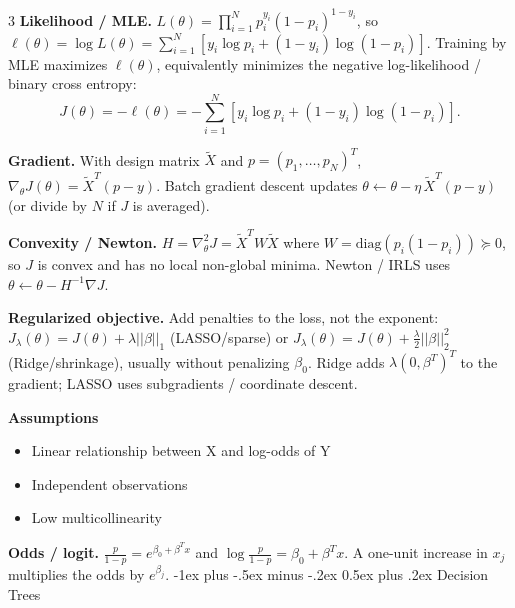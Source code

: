 \documentclass[10pt,landscape]{article}
\makeatletter
\renewcommand{\section}{\@startsection{section}{1}{0mm}%
                                {-1ex plus -.5ex minus -.2ex}%
                                {0.5ex plus .2ex}%
                                {\normalfont\large\bfseries}}
\makeatother
\begin{document}
\begin{multicols}{3}
    \textbf{Likelihood / MLE.}
    $\displaystyle L(\theta)=\prod_{i=1}^N p_i^{y_i}(1-p_i)^{1-y_i}$,
    so
    $\displaystyle \ell(\theta)=\log L(\theta)=\sum_{i=1}^N\left[y_i\log p_i+(1-y_i)\log(1-p_i)\right]$.
    Training by MLE maximizes $\ell(\theta)$, equivalently minimizes the negative log-likelihood / binary cross entropy:
    \[
        J(\theta)=-\ell(\theta)=
        -\sum_{i=1}^N\left[y_i\log p_i+(1-y_i)\log(1-p_i)\right].
    \]

    \textbf{Gradient.}
    With design matrix $\tilde X$ and $p=(p_1,\ldots,p_N)^T$,
    $\displaystyle \nabla_\theta J(\theta)=\tilde X^T(p-y)$.
    Batch gradient descent updates
    $\displaystyle \theta\leftarrow\theta-\eta\,\tilde X^T(p-y)$
    (or divide by $N$ if $J$ is averaged).
    \vspace{.2em}

    \textbf{Convexity / Newton.}
    $\displaystyle H=\nabla_\theta^2J=\tilde X^TW\tilde X$ where
    $W=\mathrm{diag}(p_i(1-p_i))\succeq0$, so $J$ is convex and has no local non-global minima. Newton / IRLS uses
    $\displaystyle \theta\leftarrow\theta-H^{-1}\nabla J$.
    \vspace{.2em}

    \textbf{Regularized objective.}
    Add penalties to the loss, not the exponent:
    $\displaystyle J_\lambda(\theta)=J(\theta)+\lambda||\beta||_1$ (LASSO/sparse) or
    $\displaystyle J_\lambda(\theta)=J(\theta)+\frac{\lambda}{2}||\beta||_2^2$ (Ridge/shrinkage), usually without penalizing $\beta_0$.
    Ridge adds $\lambda(0,\beta^T)^T$ to the gradient; LASSO uses subgradients / coordinate descent.

    \textbf{Assumptions}
    \begin{itemize}[label={--},leftmargin=4mm]
        \vspace{-1mm}
        \itemsep -.4mm
        \item Linear relationship between X and log-odds of Y
        \item Independent observations
        \item Low multicollinearity
    \end{itemize}
    \textbf{Odds / logit.}
    $\displaystyle \frac{p}{1-p}=e^{\beta_0+\beta^Tx}$ and
    $\displaystyle \log\frac{p}{1-p}=\beta_0+\beta^Tx$.
    A one-unit increase in $x_j$ multiplies the odds by $e^{\beta_j}$.
    \vspace{-.5mm}
    \section{Decision Trees}

\end{multicols}
\end{document}
